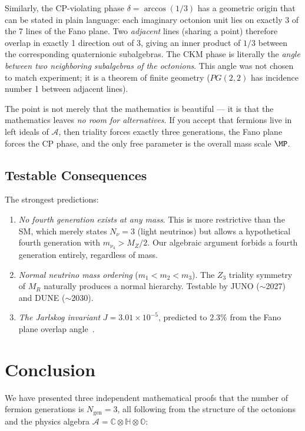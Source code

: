 \documentclass[12pt,a4paper]{article}
\theoremstyle{definition}
\theoremstyle{remark}
\newcommand{\Oct}{\mathbb{O}}
\newcommand{\Quat}{\mathbb{H}}
\newcommand{\Comp}{\mathbb{C}}
\newcommand{\Alg}{\mathcal{A}}
\begin{document}
Similarly, the CP-violating phase $\delta = \arccos(1/3)$ has a geometric 
origin that can be stated in plain language: each imaginary octonion unit 
lies on exactly 3 of the 7 lines of the Fano plane. Two \emph{adjacent} 
lines (sharing a point) therefore overlap in exactly 1 direction out of 3, 
giving an inner product of $1/3$ between the corresponding quaternionic 
subalgebras. The CKM phase is literally the \emph{angle between two 
neighboring subalgebras of the octonions}. This angle was not chosen to 
match experiment; it is a theorem of finite geometry ($PG(2,2)$ has 
incidence number 1 between adjacent lines).

The point is not merely that the mathematics is beautiful --- it is that 
the mathematics leaves \emph{no room for alternatives}. If you accept that 
fermions live in left ideals of $\Alg$, then triality forces exactly three 
generations, the Fano plane forces the CP phase, and the only free parameter 
is the overall mass scale $\MP$.

\subsection{Testable Consequences}

The strongest predictions:
\begin{enumerate}
\item \emph{No fourth generation exists at any mass}. This is more restrictive 
than the SM, which merely states $N_\nu = 3$ (light neutrinos) but allows a 
hypothetical fourth generation with $m_{\nu_4} > M_Z/2$. Our algebraic argument 
forbids a fourth generation entirely, regardless of mass.
\item \emph{Normal neutrino mass ordering} ($m_1 < m_2 < m_3$). The $Z_3$ 
triality symmetry of $M_R$ naturally produces a normal hierarchy. Testable by 
JUNO ($\sim$2027) and DUNE ($\sim$2030).
\item \emph{The Jarlskog invariant} $J = 3.01 \times 10^{-5}$, predicted to 
2.3\% from the Fano plane overlap angle~\cite{Paper2}.
\end{enumerate}

\section{Conclusion}

We have presented three independent mathematical proofs that the number of 
fermion generations is $N_{\mathrm{gen}} = 3$, all following from the structure 
of the octonions and the physics algebra $\Alg = \Comp \otimes \Quat \otimes \Oct$:
\end{document}
